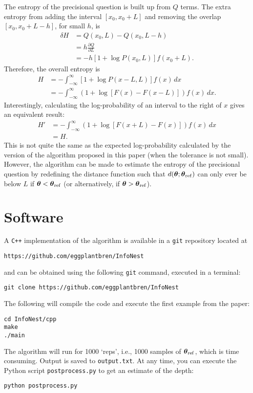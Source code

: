 \documentclass[entropy,article,accept,oneauthor,pdftex,10pt,a4paper]{mdpi}
\newcommand{\x}{\boldsymbol{\theta}}
\newcommand{\xref}{\x_{\rm ref}}
\begin{document}
The entropy of the precisional question is built up from
$Q$ terms. The extra entropy from adding the interval
$[x_0, x_0 + L]$ and removing the overlap $[x_0, x_0 + L - h]$, for small $h$, is
\begin{align}
\delta H &= Q(x_0, L) - Q(x_0, L - h)\\
         &= h\frac{\partial Q}{\partial L} \\
         &= -h\left[1 + \log P(x_0, L)\right]f(x_0 + L).
\end{align}
Therefore, the overall entropy is
\begin{align}
H &= -\int_{-\infty}^\infty
        \left[1 + \log P(x-L, L)\right]f(x)
      \, dx \\
  &= -\int_{-\infty}^\infty
        \left(1 + \log\left[F(x) - F(x-L)\right]\right)f(x)
      \, dx.
\end{align}
Interestingly, calculating the log-probability of an interval
to the right of $x$ gives an equivalent result:
\begin{align}
H' &=  -\int_{-\infty}^\infty
        \left(1 + \log\left[F(x+L) - F(x)\right]\right)f(x)
      \, dx \\
   &= H.
\end{align}
This is not quite the same as the expected log-probability calculated by
the version of the algorithm proposed in this paper (when the tolerance is not
small). However, the algorithm can be made to estimate the entropy of the
precisional question by redefining the distance function such that
$d(\x; \xref)$ can only ever be below $L$ if $\x < \xref$ (or alternatively,
if $\x > \xref$).

\appendix
\section{Software}
\label{sec:software}

A {\tt C++} implementation of the algorithm is available in a {\tt git}
repository located at
\begin{verbatim}
https://github.com/eggplantbren/InfoNest
\end{verbatim}
and can be obtained using the following {\tt git} command, executed in a
terminal:
\begin{verbatim}
git clone https://github.com/eggplantbren/InfoNest
\end{verbatim}
The following will compile the code and execute the first example from the
paper:
\begin{verbatim}
cd InfoNest/cpp
make
./main
\end{verbatim}
The algorithm will run for 1000 `reps', i.e., 1000 samples of $\xref$, which is
time consuming. Output is saved to {\tt output.txt}. At any time,
you can execute the Python script {\tt postprocess.py} to get an estimate of
the depth:
\begin{verbatim}
python postprocess.py
\end{verbatim}
\end{document}
